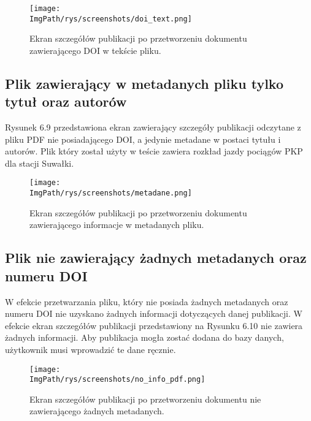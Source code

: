 \documentclass[a4paper,12pt,twoside,openany]{report}
\newcommand{\ImgPath}{.}
\begin{document}
\begin{figure}[!htbp]
	\begin{center}
		\centering
		\texttt{[image: \\ImgPath/rys/screenshots/doi\_text.png]}
	\end{center}
	\caption{Ekran szczegółów publikacji po przetworzeniu dokumentu zawierającego DOI w tekście pliku.}
	\label{zrzutPrzetwarzanieDOIText}
\end{figure}

\subsection{Plik zawierający w metadanych pliku tylko tytuł oraz autorów}
Rysunek 6.9 przedstawiona ekran zawierający szczegóły publikacji odczytane z pliku PDF nie posiadającego DOI, a jedynie metadane w postaci tytułu i autorów. Plik który został użyty w teście zawiera rozkład jazdy pociągów PKP dla stacji Suwałki.




\begin{figure}[!htbp]
	\begin{center}
		\centering
		\texttt{[image: \\ImgPath/rys/screenshots/metadane.png]}
	\end{center}
	\caption{Ekran szczegółów publikacji po przetworzeniu dokumentu zawierającego informacje w metadanych pliku.}
	\label{zrzutPrzetwarzanieMetadane}
\end{figure}

\subsection{Plik nie zawierający żadnych metadanych oraz numeru DOI}
W efekcie przetwarzania pliku, który nie posiada żadnych metadanych oraz numeru DOI nie uzyskano żadnych informacji dotyczących danej publikacji. W efekcie ekran szczegółów publikacji przedstawiony na Rysunku 6.10 nie zawiera żadnych informacji. Aby publikacja mogła zostać dodana do bazy danych, użytkownik musi wprowadzić te dane ręcznie.

\begin{figure}[!htbp]
	\begin{center}
		\centering
		\texttt{[image: \\ImgPath/rys/screenshots/no\_info\_pdf.png]}
	\end{center}
	\caption{Ekran szczegółów publikacji po przetworzeniu dokumentu nie zawierającego żadnych metadanych.}
	\label{zrzutPrzetwarzaniePusty}
\end{figure}
\end{document}
